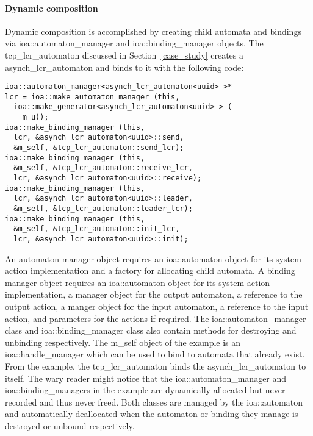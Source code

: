 \paragraph*{Dynamic composition}
Dynamic composition is accomplished by creating child automata and bindings via ioa::automaton\_manager and ioa::binding\_manager objects.
\ifjournal
The tcp\_lcr\_automaton discussed in Section~\ref{case_study} creates a asynch\_lcr\_automaton and binds to it with the following code:
\begin{lstlisting}
ioa::automaton_manager<asynch_lcr_automaton<uuid> >*
lcr = ioa::make_automaton_manager (this,
  ioa::make_generator<asynch_lcr_automaton<uuid> > (
    m_u));
ioa::make_binding_manager (this,
  lcr, &asynch_lcr_automaton<uuid>::send,
  &m_self, &tcp_lcr_automaton::send_lcr);
ioa::make_binding_manager (this,
  &m_self, &tcp_lcr_automaton::receive_lcr,
  lcr, &asynch_lcr_automaton<uuid>::receive);
ioa::make_binding_manager (this,
  lcr, &asynch_lcr_automaton<uuid>::leader,
  &m_self, &tcp_lcr_automaton::leader_lcr);
ioa::make_binding_manager (this,
  &m_self, &tcp_lcr_automaton::init_lcr,
  lcr, &asynch_lcr_automaton<uuid>::init);
\end{lstlisting}
\fi
An automaton manager object requires an ioa::automaton object for its system action implementation and a factory for allocating child automata.
A binding manager object requires an ioa::automaton object for its system action implementation, a manager object for the output automaton, a reference to the output action, a manger object for the input automaton, a reference to the input action, and parameters for the actions if required.
The ioa::automaton\_manager class and ioa::binding\_manager class also contain methods for destroying and unbinding respectively.
\ifjournal
The m\_self object of the example is an ioa::handle\_manager which can be used to bind to automata that already exist.
From the example, the tcp\_lcr\_automaton binds the asynch\_lcr\_automaton to itself.
The wary reader might notice that the ioa::automaton\_manager and ioa::binding\_managers in the example are dynamically allocated but never recorded and thus never freed.
Both classes are managed by the ioa::automaton and automatically deallocated when the automaton or binding they manage is destroyed or unbound respectively.
\fi

